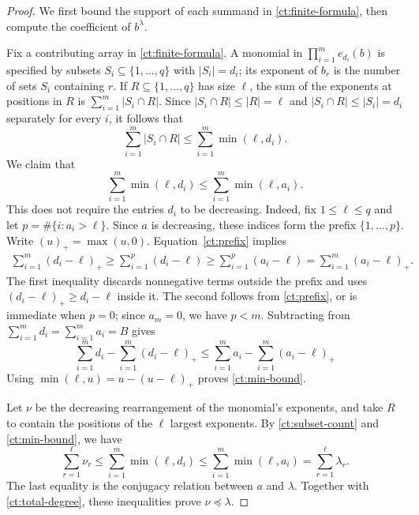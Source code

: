 \documentclass[reqno, 12pt]{article}
\numberwithin{equation}{section}
\theoremstyle{definition}
\begin{document}
\begin{proof}
We first bound the support of each summand in
\eqref{ct:finite-formula}, then compute the coefficient of $b^\lambda$.

Fix a contributing array in \eqref{ct:finite-formula}.  A monomial
in $\prod_{i=1}^m e_{d_i}(b)$ is specified by subsets
$S_i\subseteq\{1,\ldots,q\}$ with $|S_i|=d_i$; its exponent
of $b_r$ is the number of sets $S_i$ containing $r$.  If
$R\subseteq\{1,\ldots,q\}$ has size $\ell$, the sum of the
exponents at positions in $R$ is $\sum_{i=1}^m|S_i\cap R|$.  Since
$|S_i\cap R|\leq|R|=\ell$ and
$|S_i\cap R|\leq|S_i|=d_i$ separately for every $i$, it follows
that
\begin{equation}\label{ct:subset-count}
 \sum_{i=1}^m|S_i\cap R|\leq\sum_{i=1}^m\min(\ell,d_i).
\end{equation}
We claim that
\begin{equation}\label{ct:min-bound}
 \sum_{i=1}^m\min(\ell,d_i)\leq\sum_{i=1}^m\min(\ell,a_i).
\end{equation}
This does not require the entries $d_i$ to be decreasing.
Indeed, fix $1\leq \ell\leq q$ and let
$p=\#\{i:a_i>\ell\}$.  Since $a$ is decreasing, these
indices form the prefix $\{1,\ldots,p\}$.  Write
$(u)_+=\max(u,0)$.  Equation~\eqref{ct:prefix} implies
\begin{align*}
\sum_{i=1}^m(d_i-\ell)_+\geq\sum_{i=1}^{p}(d_i-\ell)\geq\sum_{i=1}^{p}(a_i-\ell)=\sum_{i=1}^m(a_i-\ell)_+.
 \end{align*}
The first inequality discards nonnegative terms outside the prefix
and uses $(d_i-\ell)_+\geq d_i-\ell$ inside it.  The second follows
from \eqref{ct:prefix}, or is immediate when $p=0$; since $a_m=0$,
we have $p<m$.  
Subtracting from $\sum_{i=1}^m d_i=\sum_{i=1}^m a_i=B$ gives
$$\sum_{i=1}^m d_i-\sum_{i=1}^m(d_i-\ell)_+ \leq \sum_{i=1}^m a_i- \sum_{i=1}^m(a_i-\ell)_+$$
Using $\min(\ell,u)=u-(u-\ell)_+$ proves \eqref{ct:min-bound}.

Let $\nu$ be the decreasing rearrangement of the monomial's
exponents, and take $R$ to contain the positions of the $\ell$
largest exponents.  By \eqref{ct:subset-count} and
\eqref{ct:min-bound}, we have 
\begin{equation}\label{ct:dominance-chain}
 \sum_{r=1}^\ell\nu_r
 \leq\sum_{i=1}^m\min(\ell,d_i)
 \leq\sum_{i=1}^m\min(\ell,a_i)
 =\sum_{r=1}^\ell\lambda_r.
\end{equation}
The last equality is the conjugacy relation between $a$ and
$\lambda$.  Together with \eqref{ct:total-degree}, these inequalities
prove $\nu\preceq\lambda$.


\end{proof}
\end{document}
